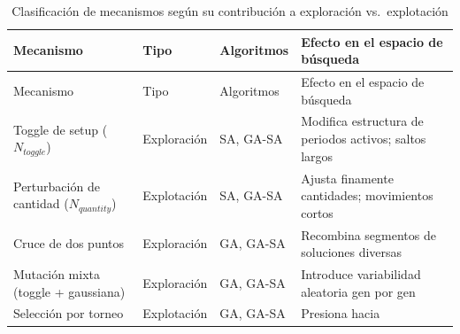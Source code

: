 \documentclass[
  spanish,
  12pt,
]{article}
\begin{document}
\begin{longtable}[]{@{}
  >{\raggedright\arraybackslash}p{}
  >{\centering\arraybackslash}p{}
  >{\centering\arraybackslash}p{}
  >{\raggedright\arraybackslash}p{}@{}}
\caption{\label{tbl:tabla_5d}Clasificación de mecanismos según su
contribución a exploración vs.~explotación}\tabularnewline
\toprule\noalign{}
\begin{minipage}[b]{\linewidth}\raggedright
Mecanismo
\end{minipage} & \begin{minipage}[b]{\linewidth}\centering
Tipo
\end{minipage} & \begin{minipage}[b]{\linewidth}\centering
Algoritmos
\end{minipage} & \begin{minipage}[b]{\linewidth}\raggedright
Efecto en el espacio de búsqueda
\end{minipage} \\
\midrule\noalign{}
\endfirsthead
\toprule\noalign{}
\begin{minipage}[b]{\linewidth}\raggedright
Mecanismo
\end{minipage} & \begin{minipage}[b]{\linewidth}\centering
Tipo
\end{minipage} & \begin{minipage}[b]{\linewidth}\centering
Algoritmos
\end{minipage} & \begin{minipage}[b]{\linewidth}\raggedright
Efecto en el espacio de búsqueda
\end{minipage} \\
\midrule\noalign{}
\endhead
\bottomrule\noalign{}
\endlastfoot
Toggle de setup (\(N_{toggle}\)) & Exploración & SA, GA-SA & Modifica
estructura de periodos activos; saltos largos \\
Perturbación de cantidad (\(N_{quantity}\)) & Explotación & SA, GA-SA &
Ajusta finamente cantidades; movimientos cortos \\
Cruce de dos puntos & Exploración & GA, GA-SA & Recombina segmentos de
soluciones diversas \\
Mutación mixta (toggle + gaussiana) & Exploración & GA, GA-SA &
Introduce variabilidad aleatoria gen por gen \\
Selección por torneo & Explotación & GA, GA-SA & Presiona hacia

\end{longtable}
\end{document}
